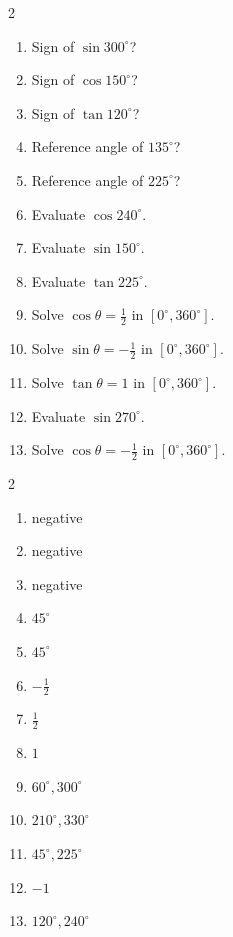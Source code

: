 \documentclass[11pt]{article}
\begin{document}
\begin{recapbox}
\begin{multicols}{2}
\small
\begin{enumerate}[leftmargin=*,itemsep=3pt]
  \item Sign of $\sin300^\circ$?
  \item Sign of $\cos150^\circ$?
  \item Sign of $\tan120^\circ$?
  \item Reference angle of $135^\circ$?
  \item Reference angle of $225^\circ$?
  \item Evaluate $\cos240^\circ$.
  \item Evaluate $\sin150^\circ$.
  \item Evaluate $\tan225^\circ$.
  \item Solve $\cos\theta=\tfrac12$ in $[0^\circ,360^\circ]$.
  \item Solve $\sin\theta=-\tfrac12$ in $[0^\circ,360^\circ]$.
  \item Solve $\tan\theta=1$ in $[0^\circ,360^\circ]$.
  \item Evaluate $\sin270^\circ$.
  \item Solve $\cos\theta=-\tfrac12$ in $[0^\circ,360^\circ]$.
\end{enumerate}
\end{multicols}
\end{recapbox}

\begin{keybox}
\begin{multicols}{2}
\small
\begin{enumerate}[leftmargin=*,itemsep=3pt]
  \item negative
  \item negative
  \item negative
  \item $45^\circ$
  \item $45^\circ$
  \item $-\tfrac12$
  \item $\tfrac12$
  \item $1$
  \item $60^\circ,300^\circ$
  \item $210^\circ,330^\circ$
  \item $45^\circ,225^\circ$
  \item $-1$
  \item $120^\circ,240^\circ$
\end{enumerate}
\end{multicols}
\end{keybox}
\end{document}
